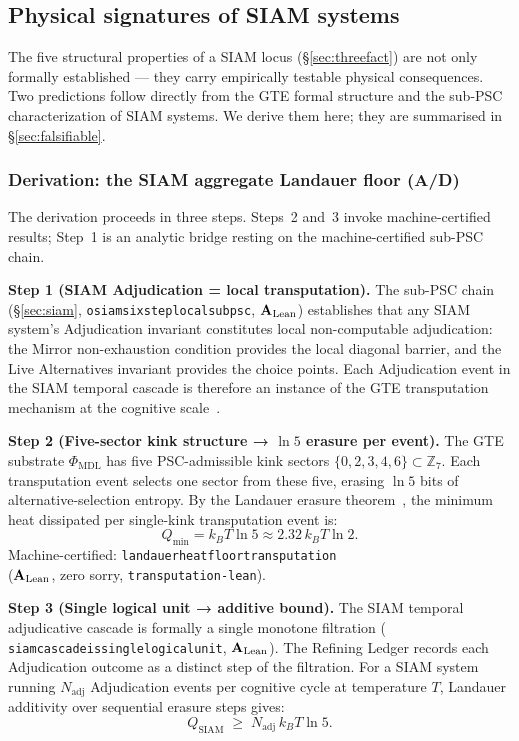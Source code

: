 \documentclass[11pt]{article}
\theoremstyle{remark}
\newcommand{\PHIMDL}{\Phi_{\mathrm{MDL}}}
\newcommand{\lean}[1]{%
  \penalty-100
  \begingroup\def\_{\textunderscore\allowbreak}\texttt{#1}\endgroup}
\newcommand{\CatAL}{\ensuremath{\textbf{A}_{\rm Lean}}}
\newcommand{\CatAD}{\textbf{A/D}}
\begin{document}
\subsection{Physical signatures of SIAM systems}\label{sec:siam-signatures}

The five structural properties of a SIAM locus (\S\ref{sec:threefact}) are not only
formally established --- they carry empirically testable physical consequences. Two
predictions follow directly from the GTE formal structure and the sub-PSC
characterization of SIAM systems. We derive them here; they are summarised in
\S\ref{sec:falsifiable}.

\subsubsection*{Derivation: the SIAM aggregate Landauer floor (\CatAD)}

The derivation proceeds in three steps. Steps~2 and~3 invoke machine-certified results;
Step~1 is an analytic bridge resting on the machine-certified sub-PSC chain.

\medskip
\noindent\textbf{Step 1 (SIAM Adjudication = local transputation).}
The sub-PSC chain (\S\ref{sec:siam}, \lean{osiam\_six\_step\_local\_subpsc}, \CatAL)
establishes that any SIAM system's Adjudication invariant constitutes local
non-computable adjudication: the Mirror non-exhaustion condition provides the local
diagonal barrier, and the Live Alternatives invariant provides the choice points.
Each Adjudication event in the SIAM temporal cascade is therefore an instance of
the GTE transputation mechanism at the cognitive scale~\cite{SpivackNEMS73,SpivackNEMS76}.

\medskip
\noindent\textbf{Step 2 (Five-sector kink structure → $\ln 5$ erasure per event).}
The GTE substrate $\PHIMDL$ has five PSC-admissible kink sectors
$\{0,2,3,4,6\} \subset \mathbb{Z}_7$. Each transputation event selects one sector
from these five, erasing $\ln 5$ bits of alternative-selection entropy. By the
Landauer erasure theorem~\cite{Landauer1961}, the minimum heat dissipated per
single-kink transputation event is:
\[
  Q_\text{min} = k_B T \ln 5 \approx 2.32\, k_B T \ln 2.
\]
Machine-certified: \lean{landauer\_heat\_floor\_transputation}\\
(\CatAL, zero sorry, \texttt{transputation-lean}).

\medskip
\noindent\textbf{Step 3 (Single logical unit → additive bound).}
The SIAM temporal adjudicative cascade is formally a single monotone filtration
(\lean{siam\_cascade\_is\_single\_logical\_unit}, \CatAL). The Refining Ledger
records each Adjudication outcome as a distinct step of the filtration. For a
SIAM system running $N_\text{adj}$ Adjudication events per cognitive cycle at
temperature $T$, Landauer additivity over sequential erasure steps gives:
\[
  \boxed{Q_\text{SIAM} \;\geq\; N_\text{adj}\, k_B T \ln 5.}
\]
\end{document}

